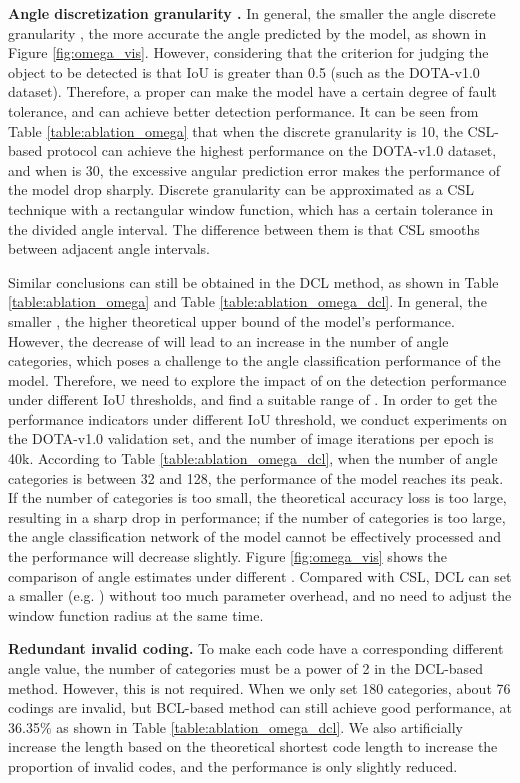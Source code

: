 \documentclass[10pt,journal,compsoc]{IEEEtran}
\begin{document}
\noindent \textbf{Angle discretization granularity .}
In general, the smaller the angle discrete granularity , the more accurate the angle predicted by the model, as shown in Figure \ref{fig:omega_vis}. However, considering that the criterion for judging the object to be detected is that IoU is greater than 0.5 (such as the DOTA-v1.0 dataset). Therefore, a proper  can make the model have a certain degree of fault tolerance, and can achieve better detection performance. It can be seen from Table \ref{table:ablation_omega} that when the discrete granularity is 10, the CSL-based protocol can achieve the highest performance on the DOTA-v1.0 dataset, and when  is 30, the excessive angular prediction error makes the performance of the model drop sharply. Discrete granularity  can be approximated as a CSL technique with a rectangular window function, which has a certain tolerance in the divided angle interval. The difference between them is that CSL smooths between adjacent angle intervals. 


Similar conclusions can still be obtained in the DCL method, as shown in Table \ref{table:ablation_omega} and Table \ref{table:ablation_omega_dcl}. In general, the smaller , the higher theoretical upper bound of the model's performance. However, the decrease of  will lead to an increase in the number of angle categories, which poses a challenge to the angle classification performance of the model. Therefore, we need to explore the impact of  on the detection performance under different IoU thresholds, and find a suitable range of . In order to get the performance indicators under different IoU threshold, we conduct experiments on the DOTA-v1.0 validation set, and the number of image iterations per epoch is 40k. According to Table \ref{table:ablation_omega_dcl}, when the number of angle categories is between 32 and 128, the performance of the model reaches its peak. If the number of categories is too small, the theoretical accuracy loss is too large, resulting in a sharp drop in performance; if the number of categories is too large, the angle classification network of the model cannot be effectively processed and the performance will decrease slightly. Figure \ref{fig:omega_vis} shows the comparison of angle estimates under different . Compared with CSL, DCL can set a smaller  (e.g. ) without too much parameter overhead, and no need to adjust the window function radius at the same time.

\noindent \textbf{Redundant invalid coding.}
To make each code have a corresponding different angle value, the number of categories must be a power of 2 in the DCL-based method. However, this is not required. When we only set 180 categories, about 76 codings are invalid, but BCL-based method can still achieve good performance, at 36.35\% as shown in Table \ref{table:ablation_omega_dcl}. We also artificially increase the length based on the theoretical shortest code length to increase the proportion of invalid codes, and the performance is only slightly reduced.
\end{document}
